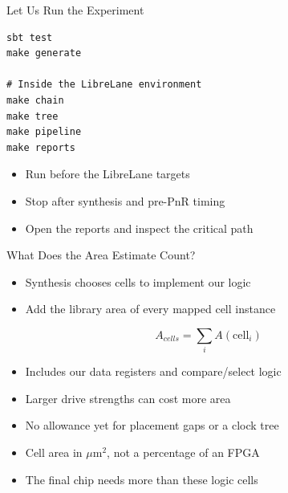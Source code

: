 \begin{frame}[fragile]{Let Us Run the Experiment}
\begin{lstlisting}[language={}]
sbt test
make generate

# Inside the LibreLane environment
make chain
make tree
make pipeline
make reports
\end{lstlisting}
\begin{itemize}
\item Run  before the LibreLane targets
\item Stop after synthesis and pre-PnR timing
\item Open the reports and inspect the critical path
\end{itemize}
\end{frame}


\begin{frame}{What Does the Area Estimate Count?}
\begin{itemize}
\item Synthesis chooses cells to implement our logic
\item Add the library area of every mapped cell instance
\end{itemize}
\[
 A_{cells} = \sum_i A(\mathrm{cell}_i)
\]
\begin{itemize}
\item Includes our data registers and compare/select logic
\item Larger drive strengths can cost more area
\item No allowance yet for placement gaps or a clock tree
\item Cell area in $\mu$m$^2$, not a percentage of an FPGA
\item The final chip needs more than these logic cells
\end{itemize}
\end{frame}

